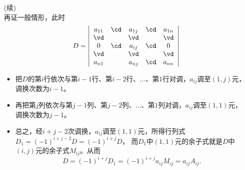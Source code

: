 \begin{frame}
  \begin{footnotesize}
  \end{footnotesize}
\end{frame}


\begin{frame}
  \begin{footnotesize}
    \proofname(续) \\[0.2cm]
    再证一般情形，此时
    $$
    D = 
    \left|
    \begin{array}{ccccc}
      a_{11} & \cd    &  a_{1j} &  \cd & a_{1n} \\
      \vd   &        &  \vd    &      & \vd \\
       0    & \cd    &  a_{ij} &  \cd & 0 \\
       \vd   &        &  \vd    &      & \vd \\ 
      a_{n1} &        &  a_{nj} & \cd & a_{nn} 
    \end{array}
    \right|
    $$
    \begin{itemize}
    \item 
      把$D$的第$i$行依次与第$i-1$行、第$i-2$行、$\ldots$、第$1$行对调，$a_{ij}$调至$(1,j)$元，
      调换次数为$i-1$。\\[0.2cm]
    \item
      再把第$j$列依次与第$j-1$列、第$j-2$列、$\ldots$、第$1$列对调，$a_{ij}$调至$(1,1)$元，
      调换次数为$j-1$。\\[0.2cm]
    \item
      总之，经$i+j-2$次调换，$a_{ij}$调至$(1,1)$元，所得行列式$D_1= (-1)^{i+j-2}D = (-1)^{i+j}D$，
      而$D_1$中$(1,1)$元的余子式就是$D$中$(i,j)$元的余子式$M_{ij}$。从而
      $$
      D = (-1)^{i+j}D_1 = (-1)^{i+j} a_{ij} M_{ij} = a_{ij} A_{ij}.
      $$
    \end{itemize}
  \end{footnotesize}
\end{frame}


